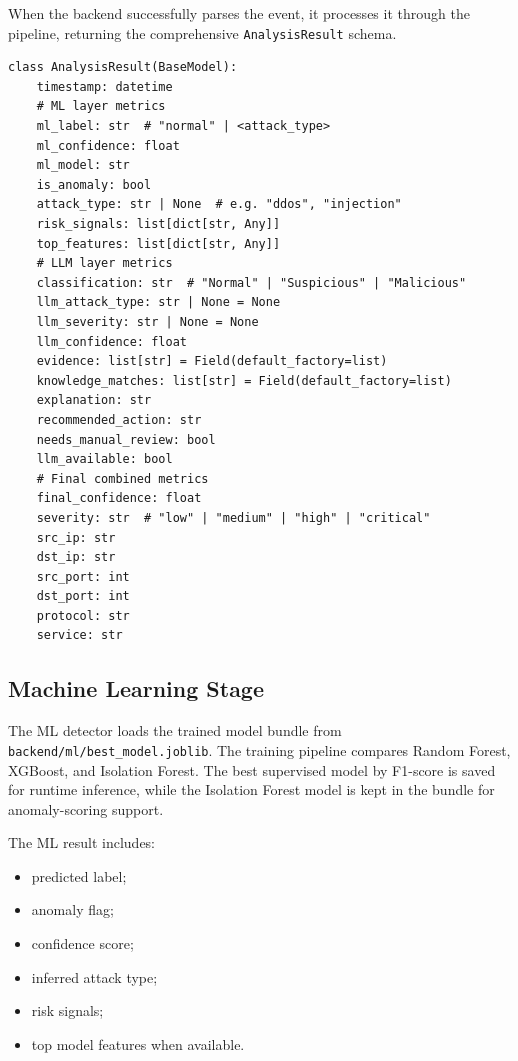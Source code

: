 \documentclass[12pt,a4paper]{report}
\begin{document}
When the backend successfully parses the event, it processes it through the pipeline, returning the comprehensive \texttt{AnalysisResult} schema.

\begin{lstlisting}[style=pythonstyle, caption={AnalysisResult validation schema in backend/schemas/schemas.py}]
class AnalysisResult(BaseModel):
    timestamp: datetime
    # ML layer metrics
    ml_label: str  # "normal" | <attack_type>
    ml_confidence: float
    ml_model: str
    is_anomaly: bool
    attack_type: str | None  # e.g. "ddos", "injection"
    risk_signals: list[dict[str, Any]]
    top_features: list[dict[str, Any]]
    # LLM layer metrics
    classification: str  # "Normal" | "Suspicious" | "Malicious"
    llm_attack_type: str | None = None
    llm_severity: str | None = None
    llm_confidence: float
    evidence: list[str] = Field(default_factory=list)
    knowledge_matches: list[str] = Field(default_factory=list)
    explanation: str
    recommended_action: str
    needs_manual_review: bool
    llm_available: bool
    # Final combined metrics
    final_confidence: float
    severity: str  # "low" | "medium" | "high" | "critical"
    src_ip: str
    dst_ip: str
    src_port: int
    dst_port: int
    protocol: str
    service: str
\end{lstlisting}

\subsection{Machine Learning Stage}

The ML detector loads the trained model bundle from
\texttt{backend/ml/best\_model.joblib}. The training pipeline compares Random
Forest, XGBoost, and Isolation Forest. The best supervised model by F1-score
is saved for runtime inference, while the Isolation Forest model is kept in
the bundle for anomaly-scoring support.

The ML result includes:

\begin{itemize}[leftmargin=1.5em]
  \item predicted label;
  \item anomaly flag;
  \item confidence score;
  \item inferred attack type;
  \item risk signals;
  \item top model features when available.
\end{itemize}
\end{document}
